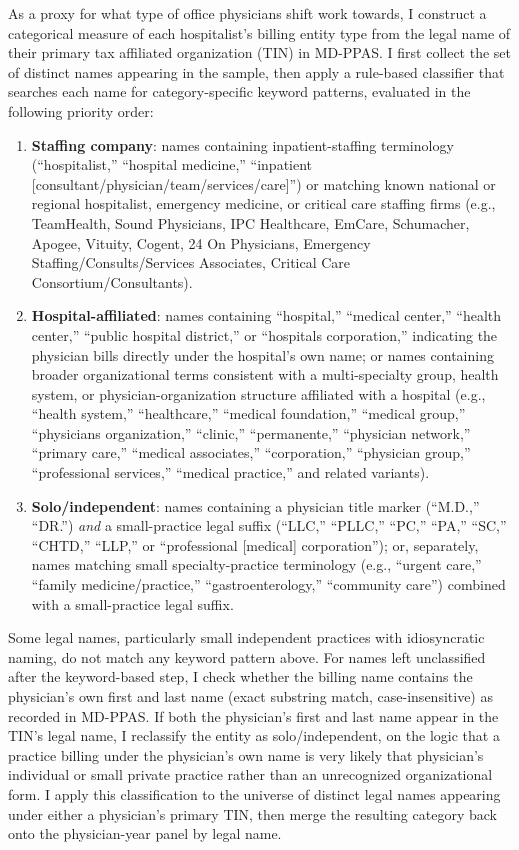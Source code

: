 \documentclass[12pt]{article}
\begin{document}
As a proxy for what type of office physicians shift work towards, I construct a categorical measure of each hospitalist's billing entity type from the legal name of their primary tax affiliated organization (TIN) in MD-PPAS. I first collect the set of distinct names appearing in the sample, then apply a rule-based classifier that searches each name for category-specific keyword patterns, evaluated in the following priority order:
\begin{enumerate}
    \item \textbf{Staffing company}: names containing inpatient-staffing terminology (``hospitalist,'' ``hospital medicine,'' ``inpatient [consultant/physician/team/services/care]'') or matching known national or regional hospitalist, emergency medicine, or critical care staffing firms (e.g., TeamHealth, Sound Physicians, IPC Healthcare, EmCare, Schumacher, Apogee, Vituity, Cogent, 24 On Physicians, Emergency Staffing/Consults/Services Associates, Critical Care Consortium/Consultants).
    
    \item \textbf{Hospital-affiliated}: names containing ``hospital,'' ``medical center,'' ``health center,'' ``public hospital district,'' or ``hospitals corporation,'' indicating the physician bills directly under the hospital's own name; or names containing broader organizational terms consistent with a multi-specialty group, health system, or physician-organization structure affiliated with a hospital (e.g., ``health system,'' ``healthcare,'' ``medical foundation,'' ``medical group,'' ``physicians organization,'' ``clinic,'' ``permanente,'' ``physician network,'' ``primary care,'' ``medical associates,'' ``corporation,'' ``physician group,'' ``professional services,'' ``medical practice,'' and related variants).
    
    \item \textbf{Solo/independent}: names containing a physician title marker (``M.D.,'' ``DR.'') \textit{and} a small-practice legal suffix (``LLC,'' ``PLLC,'' ``PC,'' ``PA,'' ``SC,'' ``CHTD,'' ``LLP,'' or ``professional [medical] corporation''); or, separately, names matching small specialty-practice terminology (e.g., ``urgent care,'' ``family medicine/practice,'' ``gastroenterology,'' ``community care'') combined with a small-practice legal suffix.
\end{enumerate}

\noindent Some legal names, particularly small independent practices with idiosyncratic naming, do not match any keyword pattern above. For names left unclassified after the keyword-based step, I check whether the billing name contains the physician's own first and last name (exact substring match, case-insensitive) as recorded in MD-PPAS. If both the physician's first and last name appear in the TIN's legal name, I reclassify the entity as solo/independent, on the logic that a practice billing under the physician's own name is very likely that physician's individual or small private practice rather than an unrecognized organizational form. I apply this classification to the universe of distinct legal names appearing under either a physician's primary TIN, then merge the resulting category back onto the physician-year panel by legal name. 
\end{document}
